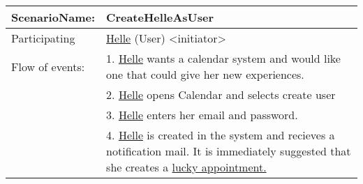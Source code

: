 {\tabulinesep=1.2mm
\begin{tabu}{ | p{3cm} | p{13cm} |}
    \hline
    ScenarioName: 			& 		CreateHelleAsUser\\ \hline
    Participating 			& 		\underline{Helle} (User) <initiator> \\	\hline
    Flow of events: 		& 		1. \underline{Helle} wants a calendar system and would like one that could give her new experiences. \\
							&		2. \underline{Helle} opens Calendar and selects create user\\
							&		3. \underline{Helle} enters her email and password.\\
							&		4. \underline{Helle} is created in the system and recieves a notification mail. It is immediately suggested that she creates a \underline{lucky appointment.}\\\hline
\end{tabu}
}
